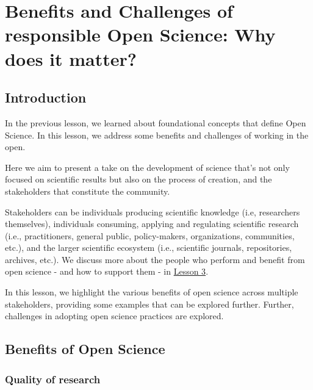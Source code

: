 \documentclass[
  letterpaper,
  DIV=11,
  numbers=noendperiod]{scrreport}
\begin{document}
\hypertarget{benefits-and-challenges-of-responsible-open-science-why-does-it-matter}{%
\chapter{Benefits and Challenges of responsible Open Science: Why does
it
matter?}\label{benefits-and-challenges-of-responsible-open-science-why-does-it-matter}}

\hypertarget{introduction-1}{%
\section{Introduction}\label{introduction-1}}

In the previous lesson, we learned about foundational concepts that
define Open Science. In this lesson, we address some benefits and
challenges of working in the open.

Here we aim to present a take on the development of science that's not
only focused on scientific results but also on the process of creation,
and the stakeholders that constitute the community.

Stakeholders can be individuals producing scientific knowledge (i.e,
researchers themselves), individuals consuming, applying and regulating
scientific research (i.e., practitioners, general public, policy-makers,
organizations, communities, etc.), and the larger scientific ecosystem
(i.e., scientific journals, repositories, archives, etc.). We discuss
more about the people who perform and benefit from open science - and
how to support them - in
\protect\hyperlink{stakeholders-of-open-science-who-practices-responsible-open-science-and-for-whom}{Lesson
3}.

In this lesson, we highlight the various benefits of open science across
multiple stakeholders, providing some examples that can be explored
further. Further, challenges in adopting open science practices are
explored.

\hypertarget{benefits-of-open-science}{%
\section{Benefits of Open Science}\label{benefits-of-open-science}}

\hypertarget{quality-of-research}{%
\subsection{Quality of research}\label{quality-of-research}}
\end{document}
